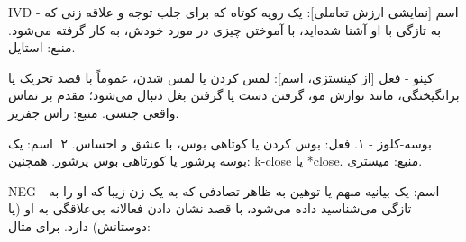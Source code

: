 IVD - اسم [نمایشی ارزش تعاملی]: یک رویه کوتاه که برای جلب توجه و علاقه زنی که به تازگی با او آشنا شده‌اید، با آموختن چیزی در مورد خودش، به کار گرفته می‌شود. منبع: استایل.

کینو - فعل [از کینستزی، اسم]: لمس کردن یا لمس شدن، عموماً با قصد تحریک یا برانگیختگی، مانند نوازش مو، گرفتن دست یا گرفتن بغل دنبال می‌شود؛ مقدم بر تماس واقعی جنسی. منبع: راس جفریز.

بوسه-کلوز - ۱. فعل: بوس کردن یا کوتاهی بوس، با عشق و احساس. ۲. اسم: یک بوسه پرشور یا کورتاهی بوس پرشور. همچنین: k-close یا *close. منبع: میستری.

NEG - اسم: یک بیانیه مبهم یا توهین به ظاهر تصادفی که به یک زن زیبا که او را به تازگی می‌شناسید داده می‌شود، با قصد نشان دادن فعالانه بی‌علاقگی به او (یا دوستانش) دارد. برای مثال: